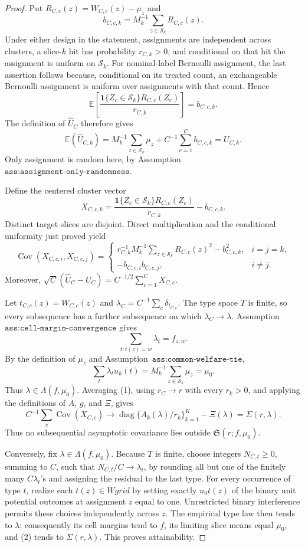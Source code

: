 \documentclass{article}
\begin{document}
\begin{proof}
Put \(R_{C,c}(z)=W_{C,c}(z)-\mu_z\) and
\[
b_{C,c,k}=M_k^{-1}\sum_{z\in\mathcal S_k}R_{C,c}(z).
\]
Under either design in the statement, assignments are independent across clusters, a slice-\(k\) hit has probability \(r_{C,k}>0\), and conditional on that hit the assignment is uniform on \(\mathcal S_k\). For nominal-label Bernoulli assignment, the last assertion follows because, conditional on its treated count, an exchangeable Bernoulli assignment is uniform over assignments with that count. Hence
\[
\mathbb E\left[\frac{\mathbf 1\{Z_c\in\mathcal S_k\}R_{C,c}(Z_c)}{r_{C,k}}\right]=b_{C,c,k}.
\]
The definition of \(\widehat U_C\) therefore gives
\[
\mathbb E(\widehat U_{C,k})=M_k^{-1}\sum_{z\in\mathcal S_k}\mu_z+C^{-1}\sum_{c=1}^Cb_{C,c,k}=U_{C,k}.
\]
Only assignment is random here, by Assumption~\(\texttt{ass:assignment-only-randomness}\).

Define the centered cluster vector
\[
X_{C,c,k}=\frac{\mathbf 1\{Z_c\in\mathcal S_k\}R_{C,c}(Z_c)}{r_{C,k}}-b_{C,c,k}.
\]
Distinct target slices are disjoint. Direct multiplication and the conditional uniformity just proved yield
\[
\operatorname{Cov}(X_{C,c,i},X_{C,c,j})=
\begin{cases}
r_{C,k}^{-1}M_k^{-1}\sum_{z\in\mathcal S_k}R_{C,c}(z)^2-b_{C,c,k}^2,&i=j=k,\\
-b_{C,c,i}b_{C,c,j},&i\ne j.
\end{cases}
\tag{1}
\]
Moreover, \(\sqrt C(\widehat U_C-U_C)=C^{-1/2}\sum_{c=1}^CX_{C,c}\).

Let \(t_{C,c}(z)=W_{C,c}(z)\) and \(\lambda_C=C^{-1}\sum_c\delta_{t_{C,c}}\). The type space \(T\) is finite, so every subsequence has a further subsequence on which \(\lambda_C\to\lambda\). Assumption~\(\texttt{ass:cell-margin-convergence}\) gives
\[
\sum_{t:t(z)=w}\lambda_t=f_{z,w}.
\]
By the definition of \(\mu_z\) and Assumption~\(\texttt{ass:common-welfare-tie}\),
\[
\sum_t\lambda_tu_k(t)=M_k^{-1}\sum_{z\in\mathcal S_k}\mu_z=\mu_0.
\]
Thus \(\lambda\in\Lambda(f,\mu_0)\). Averaging (1), using \(r_C\to r\) with every \(r_k>0\), and applying the definitions of \(A\), \(g\), and \(\Xi\), gives
\[
C^{-1}\sum_c\operatorname{Cov}(X_{C,c})\longrightarrow
\operatorname{diag}\{A_k(\lambda)/r_k\}_{k=1}^K-\Xi(\lambda)=\Sigma(r,\lambda).
\tag{2}
\]
Thus no subsequential asymptotic covariance lies outside \(\mathfrak S(r;f,\mu_0)\).

Conversely, fix \(\lambda\in\Lambda(f,\mu_0)\). Because \(T\) is finite, choose integers \(N_{C,t}\ge0\), summing to \(C\), such that \(N_{C,t}/C\to\lambda_t\), by rounding all but one of the finitely many \(C\lambda_t\)'s and assigning the residual to the last type. For every occurrence of type \(t\), realize each \(t(z)\in Wgrid\) by setting exactly \(n_0t(z)\) of the binary unit potential outcomes at assignment \(z\) equal to one. Unrestricted binary interference permits these choices independently across \(z\). The empirical type law then tends to \(\lambda\); consequently its cell margins tend to \(f\), its limiting slice means equal \(\mu_0\), and (2) tends to \(\Sigma(r,\lambda)\). This proves attainability.


\end{proof}
\end{document}
